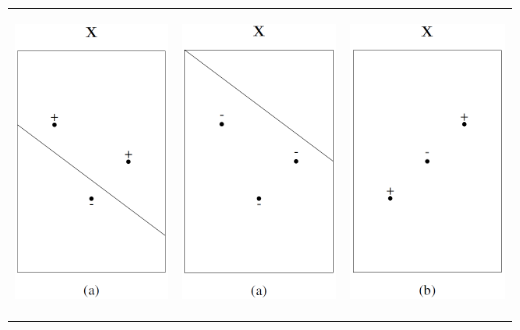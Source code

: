\documentclass[main.tex]{subfiles}
\begin{document}
\begin{center}
\begin{tabular}{ccc}
  \includegraphics[height=80mm]{img/VC_example2.PNG} &   \includegraphics[height=80mm]{img/VC_example3.PNG}&
  \includegraphics[height=80mm]{img/VC_example4.PNG}
\end{tabular}
\end{center}
\end{document}
